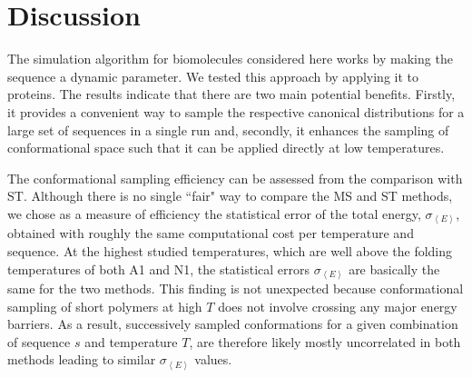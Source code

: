 \documentclass[
aip,
rsi,%
amsmath,amssymb,
reprint,%
]{revtex4-1}
\newcommand	 {\sbar}	{{s}}
\newcommand {\Pcut}     	{{P_\mathrm{cut}}}
\newcommand {\sigE}	{{\sigma_{\left < E \right >}}}
\newcommand {\SII}		{${\mathrm{S35}_{1024}}$}
\begin{document}

%
%
 
\section{Discussion}
\noindent
The simulation algorithm for biomolecules considered here works by making the sequence a dynamic parameter. We tested this approach by applying it to proteins. The results indicate that there are two main potential benefits. Firstly, it provides a convenient way to sample the respective canonical distributions for a large set of sequences in a single run and, secondly, it enhances the sampling of conformational space such that it can be applied directly at low temperatures. 

The conformational sampling efficiency can be assessed from the comparison with ST. Although there is no single ``fair" way to compare the MS and ST methods, we chose as a measure of efficiency the statistical error of the total energy, $\sigE$, obtained with roughly the same computational cost per temperature and sequence. At the highest studied temperatures, which are well above the folding temperatures of both A1 and N1, the statistical errors $\sigE$ are basically the same for the two methods. This finding is not unexpected because conformational sampling of short polymers at high $T$ does not involve crossing any major energy barriers. As a result, successively sampled conformations for a given combination of sequence $\sbar$ and temperature $T$, are therefore likely mostly uncorrelated in both methods leading to similar $\sigE$ values. 
\end{document}
